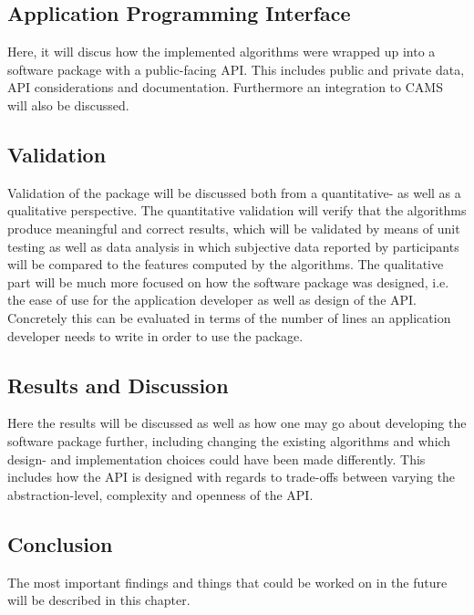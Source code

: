 \subsection*{Application Programming Interface}
Here, it will discus how the implemented algorithms were wrapped up into a software package with a public-facing API. This includes public and private data, API considerations and documentation. Furthermore an integration to CAMS will also be discussed.

\subsection*{Validation}
Validation of the package will be discussed both from a quantitative- as well as a qualitative perspective. The quantitative validation will verify that the algorithms produce meaningful and correct results, which will be validated by means of unit testing as well as data analysis in which subjective data reported by participants will be compared to the features computed by the algorithms. The qualitative part will be much more focused on how the software package was designed, i.e. the ease of use for the application developer as well as design of the API. Concretely this can be evaluated in terms of the number of lines an application developer needs to write in order to use the package.

\subsection*{Results and Discussion}
Here the results will be discussed as well as how one may go about developing the software package further, including changing the existing algorithms and which design- and implementation choices could have been made differently. This includes how the API is designed with regards to trade-offs between varying the abstraction-level, complexity and openness of the API.

\subsection*{Conclusion}
The most important findings and things that could be worked on in the future will be described in this chapter.

